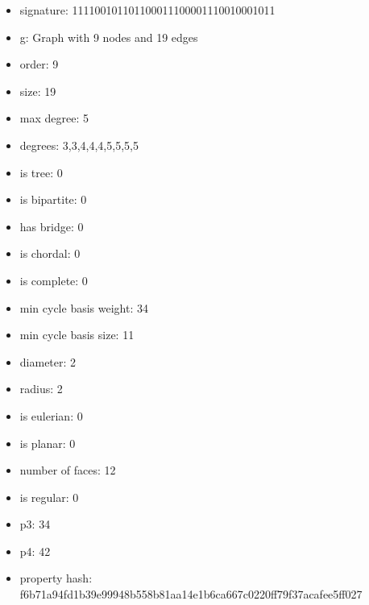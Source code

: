 \newpage
\begin{figure}
\end{figure}
\begin{itemize}
\item signature: 111100101101100011100001110010001011
\item g: Graph with 9 nodes and 19 edges
\item order: 9
\item size: 19
\item max degree: 5
\item degrees: 3,3,4,4,4,5,5,5,5
\item is tree: 0
\item is bipartite: 0
\item has bridge: 0
\item is chordal: 0
\item is complete: 0
\item min cycle basis weight: 34
\item min cycle basis size: 11
\item diameter: 2
\item radius: 2
\item is eulerian: 0
\item is planar: 0
\item number of faces: 12
\item is regular: 0
\item p3: 34
\item p4: 42
\item property hash: f6b71a94fd1b39e99948b558b81aa14e1b6ca667c0220ff79f37acafee5ff027
\end{itemize}
